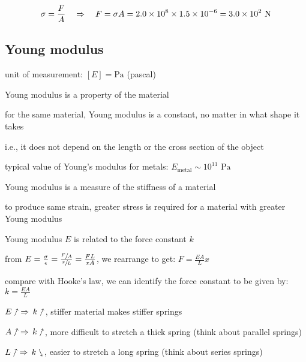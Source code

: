 \begin{soln}
    
\begin{equation*}
\sigma = \frac{F}{A} \quad \Rightarrow \quad F = \sigma A = 2.0 \times 10^8 \times 1.5 \times 10^{-6} = 3.0 \times 10^2 \text{ N} 
\end{equation*}
\end{soln}

\subsection{Young modulus}



\cmt unit of measurement: $[E] = \text{Pa}$ (pascal)

\cmt Young modulus is a property of the material

for the same material, Young modulus is a constant, no matter in what shape it takes

i.e., it does not depend on the length or the cross section of the object

\cmt typical value of Young's modulus for metals: $E_\text{metal} \sim 10^{11} \text{ Pa}$

\cmt Young modulus is a measure of the stiffness of a material

to produce same strain, greater stress is required for a material with greater Young modulus

\cmt Young modulus $E$ is related to the force constant $k$

from $E = \frac{\sigma}{\epsilon} = \frac{\sfrac{F}{A}}{\sfrac{x}{L}} = \frac{FL}{xA}$, we rearrange to get: $F = \frac{EA}{L}x$

compare with Hooke's law, we can identify the force constant to be given by: $k = \frac{EA}{L} $

\titem $E \nnearrow \, \Rightarrow \, k \nnearrow$, stiffer material makes stiffer springs

\titem $A \nnearrow \, \Rightarrow \, k \nnearrow$, more difficult to stretch a thick spring (think about parallel springs)

\titem $L \nnearrow \, \Rightarrow \, k \ssearrow$, easier to stretch a long spring (think about series springs)

